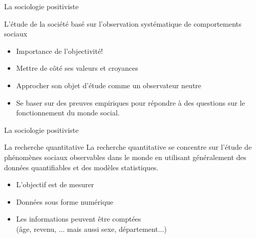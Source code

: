 \documentclass[10pt]{beamer}
\begin{document}
\begin{frame}{La sociologie positiviste}
    \begin{block}{L'étude de la société basé sur l'observation systématique de comportements sociaux}
    \end{block}
    \begin{itemize}
        \item Importance de l'objectivité!
        \item Mettre de côté ses valeurs et croyances
        \item Approcher son objet d'étude comme un observateur neutre
        \item Se baser sur des preuves empiriques pour répondre à des questions sur le fonctionnement du monde social.
    \end{itemize}

\end{frame}

\begin{frame}{La sociologie positiviste}
    \begin{block}{La recherche quantitative}
        La recherche quantitative se concentre sur l'étude de phénomènes sociaux observables dans le monde en utilisant généralement des données quantifiables et des modèles statistiques.
    \begin{itemize}
        \item L'objectif est de mesurer
        \item Données sous forme numérique
        \item Les informations peuvent être comptées \\(âge, revenu, ... mais aussi sexe, département...)
    \end{itemize}
    \end{block}

\end{frame}
\end{document}
